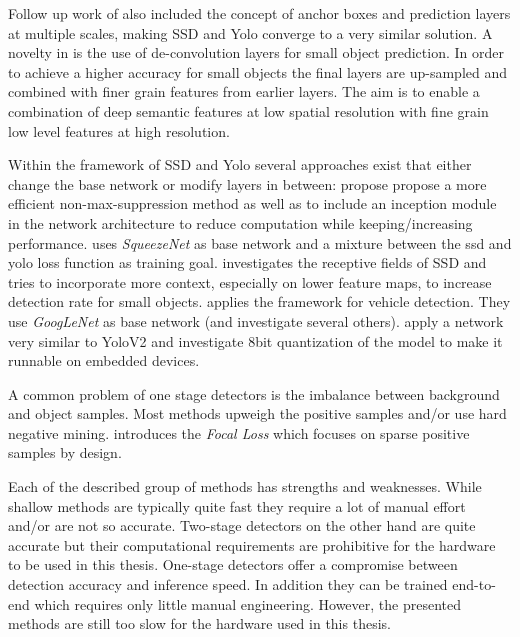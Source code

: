 Follow up work of \citeauthor{Redmon}\cite{Redmon, Redmona} also included the concept of anchor boxes and prediction layers at multiple scales, making \ac{SSD} and \ac{Yolo} converge to a very similar solution. A novelty in \cite{Redmona} is the use of de-convolution layers for small object prediction. In order to achieve a higher accuracy for small objects the final layers are up-sampled and combined with finer grain features from earlier layers. The aim is to enable a combination of deep semantic features at low spatial resolution with fine grain low level features at high resolution.

Within the framework of \ac{SSD} and \ac{Yolo} several approaches exist that either change the base network or modify layers in between: \cite{ChengchengNing2017} propose propose a more efficient non-max-suppression method as well as to include an inception module in the network architecture to reduce computation while keeping/increasing performance. \cite{Wu} uses \textit{SqueezeNet} as base network and a mixture between the ssd and yolo loss function as training goal. \cite{Xiang} investigates the receptive fields of SSD and tries to incorporate more context, especially on lower feature maps, to increase detection rate for small objects.\cite{Linb} applies the framework for vehicle detection. They use \textit{GoogLeNet} as base network (and investigate several others).\cite{TripathiSanDiego} apply a network very similar to YoloV2 and investigate 8bit quantization of the model to make it runnable on embedded devices.

A common problem of one stage detectors is the imbalance between background and object samples. Most methods upweigh the positive samples and/or use hard negative mining. \cite{Lin} introduces the \textit{Focal Loss} which focuses on sparse positive samples by design.



Each of the described group of methods has strengths and weaknesses. While shallow methods are typically quite fast they require a lot of manual effort and/or are not so accurate. Two-stage detectors on the other hand are quite accurate but their computational requirements are prohibitive for the hardware to be used in this thesis. One-stage detectors offer a compromise between detection accuracy and inference speed. In addition they can be trained end-to-end which requires only little manual engineering. However, the presented methods are still too slow for the hardware used in this thesis.




